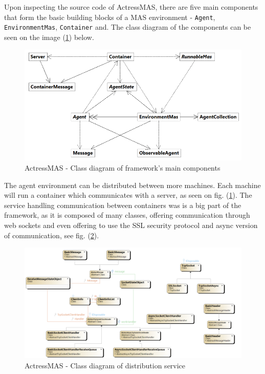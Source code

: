 \documentclass[main.tex]{subfiles}
\begin{document}
Upon inspecting the source code of ActressMAS, there are five main components that form the basic building 
blocks of a MAS environment - \texttt{Agent}, \texttt{EnvironmentMas}, \texttt{Container} 
and. The class diagram of the components can be seen on the image (\ref{actress-env}) below.

\begin{figure}[htbp]
    \centering
    \includegraphics[width=.9\textwidth]{actress-environment2.png}
    \caption{ActressMAS - Class diagram of framework's main components}
    \label{actress-env}
\end{figure}

The agent environment can be distributed between more machines. Each machine will run a container which communicates with a 
server, as seen on fig. (\ref{actress-env}). The service handling communication between containers was is a big part of the 
framework, as it is composed of many classes, offering communication through web sockets and even offering to 
use the SSL security protocol and async version of communication, see fig. (\ref{actress-distr}).

\begin{figure}[htbp]
    \centering
    \includegraphics[width=.9\textwidth]{ClassDiagram-actress-containers.png}
    \caption{ActressMAS - Class diagram of distribution service}
    \label{actress-distr}
\end{figure}
\end{document}
